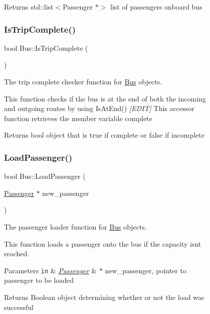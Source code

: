 \begin{figure}[H]
\begin{center}
\begin{DoxyReturn}{Returns}
std\+::list$<$\+Passenger $\ast$$>$ list of passengers onboard bus 
\end{DoxyReturn}
\mbox{\label{classBus_a9c64b0801bf589f121fb0598b70a99b4}} 
\subsubsection{\texorpdfstring{Is\+Trip\+Complete()}{IsTripComplete()}}
{\footnotesize\ttfamily bool Bus\+::\+Is\+Trip\+Complete (\begin{DoxyParamCaption}{ }\end{DoxyParamCaption})}



The trip complete checker function for \hyperlink{classBus}{Bus} objects. 

This function checks if the bus is at the end of both the incoming and outgoing routes by using Is\+At\+End() {\itshape \mbox{[}E\+D\+IT\mbox{]}} This accessor function retrieves the member variable complete

\begin{DoxyReturn}{Returns}
bool object that is true if complete or false if incomplete 
\end{DoxyReturn}
\mbox{\label{classBus_aae72290f9daf683b3068428eee0a9ee7}} 
\subsubsection{\texorpdfstring{Load\+Passenger()}{LoadPassenger()}}
{\footnotesize\ttfamily bool Bus\+::\+Load\+Passenger (\begin{DoxyParamCaption}\item[{\hyperlink{classPassenger}{Passenger} $\ast$}]{new\+\_\+passenger }\end{DoxyParamCaption})}



The passenger loader function for \hyperlink{classBus}{Bus} objects. 

This function loads a passenger onto the bus if the capacity isn\textquotesingle{}t reached.


\begin{DoxyParams}[1]{Parameters}
\mbox{\tt in}  & {\em \hyperlink{classPassenger}{Passenger}} & $\ast$ new\+\_\+passenger, pointer to passenger to be loaded\\
\hline
\end{DoxyParams}
\begin{DoxyReturn}{Returns}
Boolean object determining whether or not the load was successful 
\end{DoxyReturn}
\mbox{\label{classBus_a5e667186d6db0916ebab0e4eff3312c8}} 

\end{center}
\end{figure}
